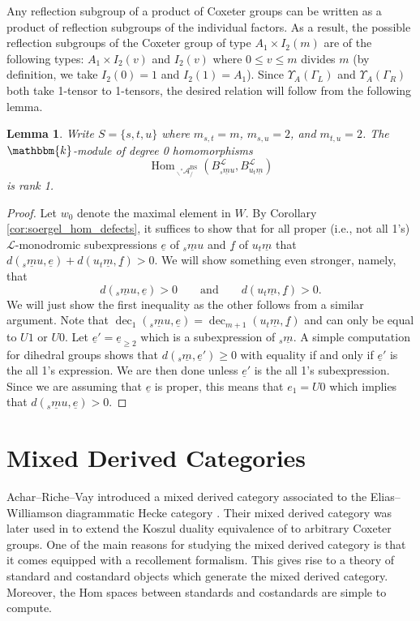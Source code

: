 \documentclass{amsart}
\renewcommand{\k}{\mathbbm{k}}
\newcommand{\scrL}{\mathcal{L}}
\DeclareMathOperator{\Hom}{Hom}
\DeclareMathOperator{\BS}{BS}
\newcommand{\grAmon}[2]{\:_{#1 \backslash} \!\! {}^{\circ} \mathcal{A}_{/ #2} }
\DeclareMathOperator{\dec}{dec}
\newcommand{\ue}{\underline{e}}
\newcommand{\uf}{\underline{f}}
\newtheorem{lemma}[subsubsection]{Lemma}
\theoremstyle{definition}
\numberwithin{equation}{subsection}
\begin{document}
Any reflection subgroup of a product of Coxeter groups can be written as a product of reflection subgroups of the individual factors.
As a result, the possible reflection subgroups of the Coxeter group of type $A_1 \times I_2 (m)$ are of the following types: $A_1 \times I_2 (v)$ and $I_2 (v)$ where $0 \leq v \leq m$ divides $m$ (by definition, we take $I_2 (0) = 1$ and $I_2 (1) = A_1$).
Since $\Upsilon_A (\Gamma_L)$ and $\Upsilon_A (\Gamma_R)$ both take 1-tensor to 1-tensors, the desired relation will follow from the following lemma.

\begin{lemma}\label{lem:homs_for_A1_I2m}
    Write $S = \{s,t,u\}$ where $m_{s,t} = m$, $m_{s,u} = 2$, and $m_{t,u}= 2$. 
    The $\k$-module of degree 0 homomorphisms
    \[ \Hom_{\grAmon{}{}^{\BS}} (B_{{}_s \underline{m} u}^{\scrL}, B_{u {}_t \underline{m}}^{\scrL}) \]
    is rank 1.
\end{lemma}
\begin{proof}
    Let $w_0$ denote the maximal element in $W$.
    By Corollary \ref{cor:soergel_hom_defects}, it suffices to show that for all proper (i.e., not all 1's) $\scrL$-monodromic subexpressions $\ue$ of ${}_s \underline{m} u$ and $\uf$ of $u {}_t \underline{m}$ that
    $d ({}_s \underline{m} u, \ue) + d (u {}_t \underline{m}, \uf) > 0$.
    We will show something even stronger, namely, that 
    \[d ({}_s \underline{m} u, \ue) > 0 \qquad \text{and}\qquad d (u {}_t \underline{m}, \uf) > 0.\]
    We will just show the first inequality as the other follows from a similar argument.
    Note that $\dec_1 ({}_s \underline{m} u, \ue) = \dec_{m+1} (u {}_t \underline{m}, \uf)$ and can only be equal to $U1$ or $U0$.
    Let $\ue' = \ue_{\geq 2}$ which is a subexpression of ${}_s \underline{m}$.
    A simple computation for dihedral groups shows that $d ({}_s \underline{m}, \ue') \geq 0$ with equality if and only if $\ue'$ is the all 1's expression.
    We are then done unless $\ue'$ is the all 1's subexpression. Since we are assuming that $\ue$ is proper, this means that $e_1 = U0$ which implies that $d ({}_s \underline{m} u, \ue) > 0$.
\end{proof}

    \section{Mixed Derived Categories}\label{apdx:mdc}
Achar--Riche--Vay introduced a mixed derived category associated to the Elias--Williamson diagrammatic Hecke category \cite{ARV}.
Their mixed derived category was later used in \cite{RV} to extend the Koszul duality equivalence of \cite{AMRW2} to arbitrary Coxeter groups.
One of the main reasons for studying the mixed derived category is that it comes equipped with a recollement formalism.
This gives rise to a theory of standard and costandard objects which generate the mixed derived category. Moreover, the Hom spaces between standards and costandards are simple to compute. 
\end{document}
